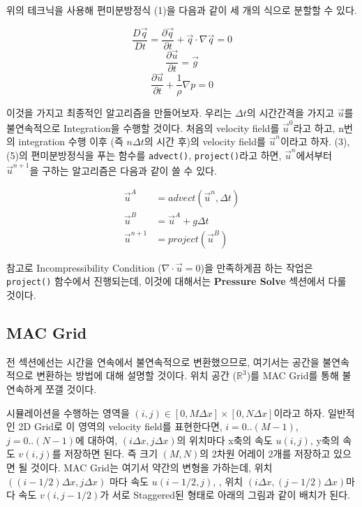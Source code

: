 \documentclass[10pt, A4]{article}
\begin{document}
위의 테크닉을 사용해 편미분방정식 (1)을 다음과 같이 세 개의 식으로 분할할 수 있다.

\begin{equation}
  \frac{D\vec{q}}{Dt} = \frac{\partial \vec{q}}{\partial t} + \vec{q} \cdot \nabla \vec{q} = 0
\end{equation}
\begin{equation}
  \frac{\partial \vec{u}}{\partial t} = \vec{g}
\end{equation}
\begin{equation}
  \frac{\partial \vec{u}}{\partial t} + \frac{1}{\rho} \nabla p = 0
\end{equation}

이것을 가지고 최종적인 알고리즘을 만들어보자.
우리는 $\Delta t$의 시간간격을 가지고 $\vec{u}$를 불연속적으로 Integration을 수행할 것이다. 처음의 velocity field를 $\vec{u}^0$라고 하고, n번의 integration 수행 이후 (즉 $n \Delta t$의 시간 후)의 velocity field를 $\vec{u}^n$이라고 하자. (3), (5)의 편미분방정식을 푸는 함수를 \texttt{advect()}, \texttt{project()}라고 하면, $\vec{u}^n$에서부터 $\vec{u}^{n+1}$을 구하는 알고리즘은 다음과 같이 쓸 수 있다. \cite[p.20]{fluid-sim-cg}

\begin{align}
  \vec{u}^A &= advect(\vec{u}^n, \Delta t) \\
  \vec{u}^B &= \vec{u}^A + g \Delta t \\
  \vec{u}^{n+1} &= project(\vec{u}^B)
\end{align}

참고로 Incompressibility Condition ($\nabla \cdot \vec{u} = 0$)을 만족하게끔 하는 작업은 \texttt{project()} 함수에서 진행되는데, 이것에 대해서는 \textbf{Pressure Solve} 섹션에서 다룰 것이다.

\subsection{MAC Grid}

전 섹션에선는 시간을 연속에서 불연속적으로 변환했으므로, 여기서는 공간을 불연속적으로 변환하는 방법에 대해 설명할 것이다. 위치 공간 ($\mathbb{R}^3$)를 MAC Grid를 통해 불연속하게 쪼갤 것이다. \cite[p.21-25]{fluid-sim-cg}

시뮬레이션을 수행하는 영역을 $(i, j) \in [0, M \Delta x] \times [0, N \Delta x]$이라고 하자. 일반적인 2D Grid로 이 영역의 velocity field를 표현한다면, $i = 0..(M-1)$, $j = 0..(N-1)$에 대하여,  $(i \Delta x, j \Delta x)$의 위치마다 x축의 속도 $u(i, j)$, y축의 속도 $v(i, j)$를 저장하면 된다. 즉 크기 $(M, N)$의 2차원 어레이 2개를 저장하고 있으면 될 것이다. MAC Grid는 여기서 약간의 변형을 가하는데, 위치 $((i-1/2) \Delta x, j \Delta x)$ 마다 속도 $u(i-1/2, j)$, , 위치 $(i \Delta x, (j-1/2) \Delta x)$마다 속도 $v(i,j-1/2)$가 서로 Staggered된 형태로 아래의 그림과 같이 배치가 된다.
\end{document}
